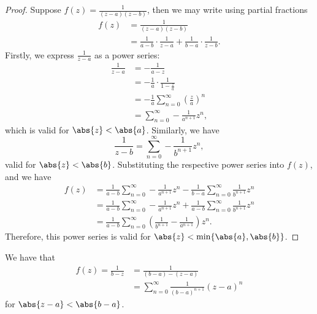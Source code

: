 \documentclass[12pt, a4paper]{article}
\begin{document}
\begin{proof}
    Suppose \(f(z) =\frac{1}{(z-a)(z-b)}\), then we may write using partial fractions 
    \[\begin{aligned}
        f(z) &= \frac{1}{(z-a)(z-b)} \\
        &= \frac{1}{a-b} \cdot \frac{1}{z-a} + \frac{1}{b-a} \cdot \frac{1}{z-b}.
    \end{aligned}\]
    Firstly, we express \(\frac{1}{z-a}\) as a power series:
    \[\begin{aligned}
        \frac{1}{z-a} &= -\frac{1}{a-z} \\
        &= - \frac{1}{a} \cdot \frac{1}{1-\frac{z}{a}} \\
        &= -\frac{1}{a} \sum_{n=0}^{\infty} \left( \frac{z}{a} \right)^n \\
        &= \sum_{n=0}^{\infty} - \frac{1}{a^{n+1}} z^n,
    \end{aligned}\]
    which is valid for \(\abs{z}<\abs{a}\).
    Similarly, we have 
    \[\frac{1}{z-b} = \sum_{n=0}^{\infty} - \frac{1}{b^{n+1}} z^n,\]
    valid for \(\abs{z}<\abs{b}\).
    Substituting the respective power series into \(f(z)\), and we have 
    \[\begin{aligned}
        f(z) &= \frac{1}{a-b}\sum_{n=0}^{\infty} - \frac{1}{a^{n+1}} z^n - \frac{1}{b-a} \sum_{n=0}^{\infty} \frac{1}{b^{n+1}} z^n \\
        &= \frac{1}{a-b}\sum_{n=0}^{\infty}- \frac{1}{a^{n+1}} z^n+ \frac{1}{a-b} \sum_{n=0}^{\infty} \frac{1}{b^{n+1}} z^n \\
        &= \frac{1}{a-b} \sum_{n=0}^{\infty} \left(\frac{1}{b^{n+1}} -\frac{1}{a^{n+1}} \right) z^n.
    \end{aligned}\]
    Therefore, this power series is valid for \(\abs{z}<\min\{\abs{a},\abs{b}\}\).
\end{proof}

\begin{theorem}
    We have that 
    \[\begin{aligned}
        f(z) =\frac{1}{b-z} &= \frac{1}{(b-a)-(z-a)} \\
        &= \sum_{n=0}^{\infty} \frac{1}{(b-a)^{n+1}}(z-a)^n
    \end{aligned}\]
    for \(\abs{z-a}<\abs{b-a}\).
\end{theorem}
\end{document}
